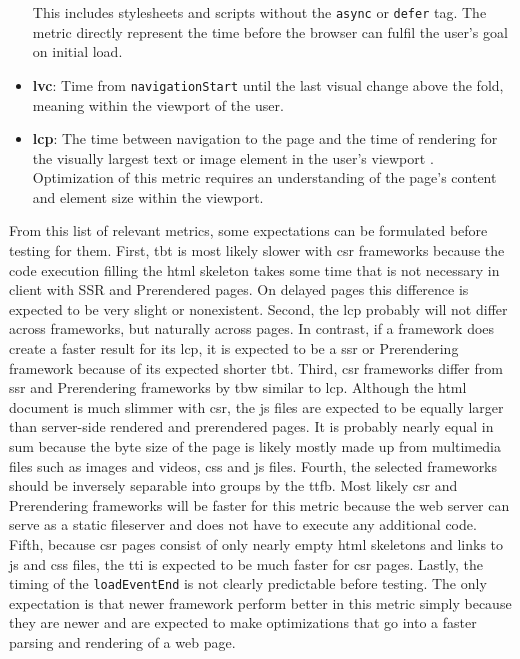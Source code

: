 \documentclass[a4paper, 10pt]{article}
\begin{document}
\begin{itemize}
  This includes stylesheets and scripts without the \verb|async| or \verb|defer| tag.
  The metric directly represent the time before the browser can fulfil the user's goal on initial load.
  \item \textbf{\acrfull{lvc}}: Time from \verb|navigationStart| until the last visual change above the fold, meaning within the viewport of the user. %
  \item \textbf{\acrfull{lcp}}: The time between navigation to the page and the time of rendering for the visually largest text or image element in the user's viewport \citep{lcpDocumentation}.
  Optimization of this metric requires an understanding of the page's content and element size within the viewport.
\end{itemize}

From this list of relevant metrics, some expectations can be formulated before testing for them.
First, \acrshort{tbt} is most likely slower with \acrshort{csr} frameworks because the code execution filling the \acrshort{html} skeleton takes some time that is not necessary in client with SSR and Prerendered pages.
On delayed pages this difference is expected to be very slight or nonexistent.
Second, the \acrshort{lcp} probably will not differ across frameworks, but naturally across pages.
In contrast, if a framework does create a faster result for its \acrshort{lcp}, it is expected to be a \acrshort{ssr} or Prerendering framework because of its expected shorter \acrshort{tbt}.
Third, \acrshort{csr} frameworks differ from \acrshort{ssr} and Prerendering frameworks by \acrlong{tbw} similar to \acrlong{lcp}.
Although the \acrshort{html} document is much slimmer with \acrshort{csr}, the \acrshort{js} files are expected to be equally larger than server-side rendered and prerendered pages.
It is probably nearly equal in sum because the byte size of the page is likely mostly made up from multimedia files such as images and videos, \acrshort{css} and \acrlong{js} files. 
Fourth, the selected frameworks should be inversely separable into groups by the \acrlong{ttfb}.
Most likely \acrshort{csr} and Prerendering frameworks will be faster for this metric because the web server can serve as a static fileserver and does not have to execute any additional code.
Fifth, because \acrshort{csr} pages consist of only nearly empty \acrshort{html} skeletons and links to \acrshort{js} and \acrshort{css} files, the \acrshort{tti} is expected to be much faster for \acrshort{csr} pages.
Lastly, the timing of the \verb|loadEventEnd| is not clearly predictable before testing.
The only expectation is that newer framework perform better in this metric simply because they are newer and are expected to make optimizations that go into a faster parsing and rendering of a web page.
\end{document}

